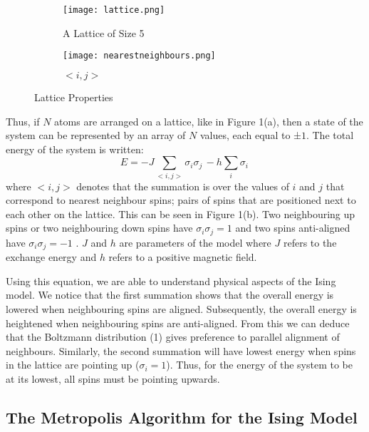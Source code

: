 \documentclass[a4paper]{article}
\begin{document}
\begin{figure}[h]
\centering
\begin{subfigure}{0.3\textwidth}
\texttt{[image: lattice.png]} 
\caption{A Lattice of Size 5}
\label{fig:subim1}
\end{subfigure}
\hspace{1cm}
\begin{subfigure}{0.2\textwidth}
\texttt{[image: nearestneighbours.png]}
\vspace{0.6cm}
\caption{$<i, j>$}
\label{fig:subim2}
\end{subfigure}
\caption{Lattice Properties}
\label{fig:image2}
\end{figure}

Thus, if $N$ atoms are arranged on a lattice, like in Figure 1(a), then a state of the system can be represented by an array of $N$ values, each equal to ±$1$.
The total energy of the system is written:
\begin{equation}
E = -J\sum_{<i,j>} \sigma_{i}\sigma_{j} \, - h\sum_{i} \sigma_{i} \,
\end{equation}
where $<i,j>$ denotes that the summation is over the values of $i$ and $j$ that correspond to nearest neighbour spins; pairs of spins that are positioned next to each other on the lattice. This can be seen in Figure 1(b). Two neighbouring up spins or two neighbouring down spins have $\sigma_{i}\sigma_{j} = 1$ and two spins anti-aligned have $\sigma_{i}\sigma_{j}= -1$ \cite{2}. $J$ and $h$ are parameters of the model where $J$ refers to the exchange energy and $h$ refers to a positive magnetic field.

Using this equation, we are able to understand physical aspects of the Ising model. We notice that the first summation shows that the overall energy is lowered when neighbouring spins are aligned. Subsequently, the overall energy is heightened when neighbouring spins are anti-aligned. From this we can deduce that the Boltzmann distribution (1) gives preference to parallel alignment of neighbours. Similarly, the second summation will have lowest energy when spins in the lattice are pointing up ($\sigma_{i} = 1$). Thus, for the energy of the system to be at its lowest, all spins must be pointing upwards. 

\subsection{The Metropolis Algorithm for the Ising Model}
\end{document}
